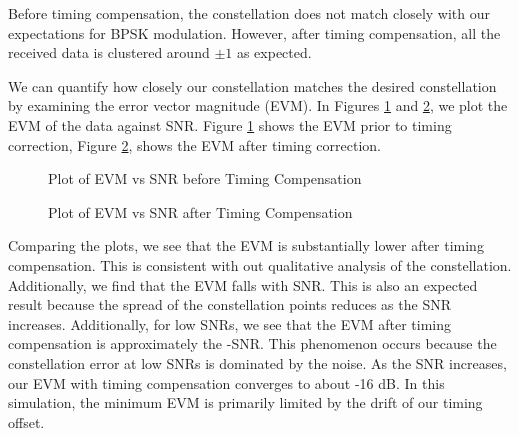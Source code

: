 \documentclass{article}
\begin{document}
\noindent Before timing compensation, the constellation does not match closely with our expectations for BPSK modulation. However, after timing compensation, all the received data is clustered around $\pm 1$ as expected.

We can quantify how closely our constellation matches the desired constellation by examining the error vector magnitude (EVM). In Figures \ref{fig::evm_vs_snr_no_correction} and \ref{fig::evm_vs_snr}, we plot the EVM of the data against SNR. Figure \ref{fig::evm_vs_snr_no_correction} shows the EVM prior to timing correction, Figure \ref{fig::evm_vs_snr}, shows the EVM after timing correction. 

\begin{figure}[H]
	\centerline{}
	\caption{Plot of EVM vs SNR before Timing Compensation}
	\label{fig::evm_vs_snr_no_correction}
\end{figure}

\begin{figure}[H]
	\centerline{}
	\caption{Plot of EVM vs SNR after Timing Compensation}
	\label{fig::evm_vs_snr}
\end{figure}

Comparing the plots, we see that the EVM is substantially lower after timing compensation. This is consistent with out qualitative analysis of the constellation. Additionally, we find that the EVM falls with SNR. This is also an expected result because the spread of the constellation points reduces as the SNR increases. Additionally, for low SNRs, we see that the EVM after timing compensation is approximately the -SNR. This phenomenon occurs because the constellation error at low SNRs is dominated by the noise. As the SNR increases, our EVM with timing compensation converges to about -16 dB. In this simulation, the minimum EVM is primarily limited by the drift of our timing offset.
\end{document}
